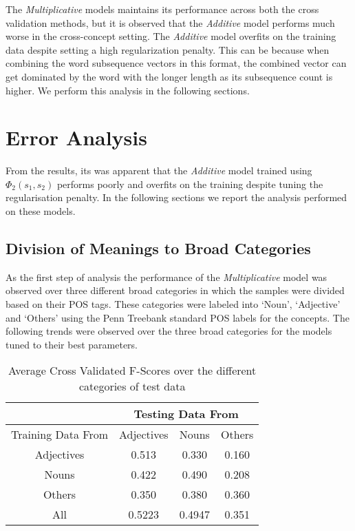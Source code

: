 The \textit{Multiplicative} models maintains its performance across both the cross validation methods, but it is observed that the \textit{Additive} model performs much worse in the cross-concept setting. The \textit{Additive} model overfits on the training data despite setting a high regularization penalty. This can be because when combining the word subsequence vectors in this format, the combined vector can get dominated by the word with the longer length as its subsequence count is higher. We perform this analysis in the following sections.

\section{Error Analysis}

From the results, its was apparent that the \textit{Additive} model trained using $\Phi_2(s_1, s_2)$ performs poorly and overfits on the training despite tuning the regularisation penalty. In the following sections we report the analysis performed on these models.

\subsection{Division of Meanings to Broad Categories}

As the first step of analysis the performance of the \textit{Multiplicative} model was observed over three different broad categories in which the samples were divided based on their POS tags. These categories were labeled into `Noun', `Adjective' and `Others' using the Penn Treebank standard POS labels for the concepts. The following trends were observed over the three broad categories for the models tuned to their best parameters.

\begin{table}[h]
\centering
\begin{tabular}{c|c|c|c|}
\cline{2-4}
                                         & \multicolumn{3}{c|}{Testing Data From} \\ \hline
\multicolumn{1}{|c|}{Training Data From} & Adjectives     & Nouns     & Others    \\ \hline
\multicolumn{1}{|c|}{Adjectives}         & 0.513          & 0.330     & 0.160     \\ \hline
\multicolumn{1}{|c|}{Nouns}              & 0.422          & 0.490     & 0.208     \\ \hline
\multicolumn{1}{|c|}{Others}             & 0.350          & 0.380     & 0.360     \\ \hline
\multicolumn{1}{|c|}{All}                & 0.5223         & 0.4947    & 0.351     \\ \hline
\end{tabular}
\caption{Average Cross Validated F-Scores over the different categories of test data}
\end{table}

